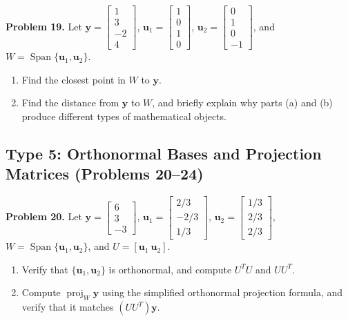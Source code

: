 \documentclass[11pt, letterpaper]{article}
\theoremstyle{definition}
\theoremstyle{remark}
\begin{document}
\textbf{Problem 19.} Let $\mathbf{y} = \begin{bmatrix} 1 \\ 3 \\ -2 \\ 4 \end{bmatrix}$, $\mathbf{u}_1 = \begin{bmatrix} 1 \\ 0 \\ 1 \\ 0 \end{bmatrix}$, $\mathbf{u}_2 = \begin{bmatrix} 0 \\ 1 \\ 0 \\ -1 \end{bmatrix}$, and $W = \operatorname{Span}\{\mathbf{u}_1, \mathbf{u}_2\}$.
\begin{enumerate}[label=(\alph*)]
    \item Find the closest point in $W$ to $\mathbf{y}$.
    \item Find the distance from $\mathbf{y}$ to $W$, and briefly explain why parts (a) and (b) produce different types of mathematical objects.
\end{enumerate}

\subsection{Type 5: Orthonormal Bases and Projection Matrices (Problems 20--24)}

\textbf{Problem 20.} Let $\mathbf{y} = \begin{bmatrix} 6 \\ 3 \\ -3 \end{bmatrix}$, $\mathbf{u}_1 = \begin{bmatrix} 2/3 \\ -2/3 \\ 1/3 \end{bmatrix}$, $\mathbf{u}_2 = \begin{bmatrix} 1/3 \\ 2/3 \\ 2/3 \end{bmatrix}$, $W = \operatorname{Span}\{\mathbf{u}_1, \mathbf{u}_2\}$, and $U = [\mathbf{u}_1 \ \mathbf{u}_2]$.
\begin{enumerate}[label=(\alph*)]
    \item Verify that $\{\mathbf{u}_1, \mathbf{u}_2\}$ is orthonormal, and compute $U^T U$ and $UU^T$.
    \item Compute $\operatorname{proj}_W \mathbf{y}$ using the simplified orthonormal projection formula, and verify that it matches $(UU^T)\mathbf{y}$.
\end{enumerate}
\end{document}
